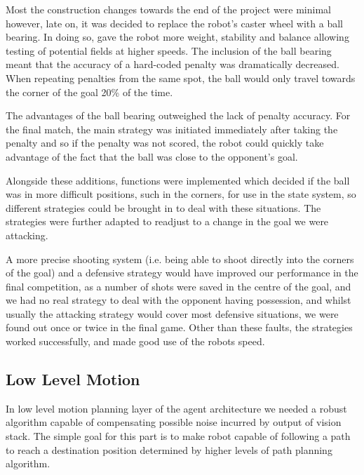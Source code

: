 Most the construction changes towards the end of the project were minimal however, late on, it was decided to replace the robot's caster wheel with a ball bearing. In doing so, gave the robot more weight, stability and balance allowing testing of potential fields at higher speeds. The inclusion of the ball bearing meant that the accuracy of a hard-coded penalty was dramatically decreased. When repeating penalties from the same spot, the ball would only travel towards the corner of the goal 20\% of the time.\linebreak

The advantages of the ball bearing outweighed the lack of penalty accuracy. For the final match, the main strategy was initiated immediately after taking the penalty and so if the penalty was not scored, the robot could quickly take advantage of the fact that the ball was close to the opponent's goal.\linebreak

Alongside these additions, functions were implemented which decided if the ball was in more difficult positions, such in the corners, for use in the state system, so different strategies could be brought in to deal with these situations. The strategies were further adapted to readjust to a change in the goal we were attacking. \linebreak

A more precise shooting system (i.e. being able to shoot directly into the corners of the goal) and a defensive strategy would have improved our performance in the final competition, as a number of shots were saved in the centre of the goal, and we had no real strategy to deal with the opponent having possession, and whilst usually the attacking strategy would cover most defensive situations, we were found out once or twice in the final game. Other than these faults, the strategies worked successfully, and made good use of the robots speed.

\subsection{Low Level Motion}
In low level motion planning layer of the agent architecture we needed a robust algorithm capable of compensating possible noise incurred by output of vision stack.  The simple goal for this part is to make robot capable of following a path to reach a destination position determined by higher levels of path planning algorithm.\linebreak


